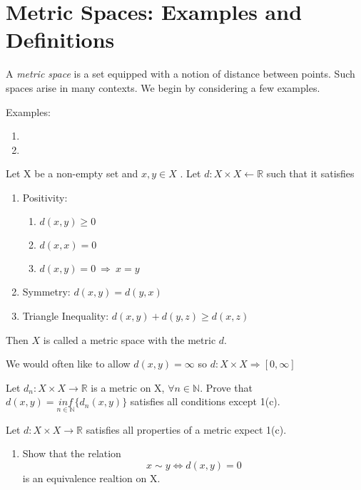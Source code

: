 \section{Metric Spaces: Examples and Definitions}

A \emph{metric space} is a set equipped with a notion of distance between points. Such
spaces arise in many contexts. We begin by considering a few examples.

\vspace{0.2in}
\noindent Examples:

\begin{enumerate}
\item
\item
\end{enumerate}

\begin{defn}
Let X be a non-empty set and $x, y \in X$ . Let $d: X\times X \leftarrow \mathbb{R}$
such that it satisfies
\begin{enumerate}
    \item Positivity:
    \begin{enumerate}
        \item $d(x,y) \geq 0$
        \item $d(x,x) = 0$
        \item $d(x,y) = 0 \ \Rightarrow\ x = y$
    \end{enumerate}
    \item Symmetry:  $d(x,y) = d(y, x)$
    \item Triangle Inequality: $d(x,y)+d(y,z) \geq d(x,z)$
\end{enumerate}
Then $X$ is called a metric space with the metric $d$.
\begin{rmk}
    We would often like to allow $d(x,y)=\infty$ so $d:X\times X \Rightarrow [0, \infty]$
\end{rmk}

\begin{exr}
Let $d_{n} : X\times X \rightarrow \mathbb{R}$ is a metric on X, $\forall n \in \mathbb{N}$.
Prove that $d(x, y) = {inf}\limits_{n \in \mathbb{N}}\{d_{n}(x,y)\}$ satisfies
all conditions except 1(c).
\end{exr}

\begin{exr}
Let $d : X\times X \rightarrow \mathbb{R}$ satisfies all properties of a metric
expect 1(c).
    \begin{enumerate}
        \item Show that the relation
            $$x \sim y \Leftrightarrow d(x,y) = 0$$
          is an equivalence realtion on X.


\end{enumerate}
\end{exr}
\end{defn}
